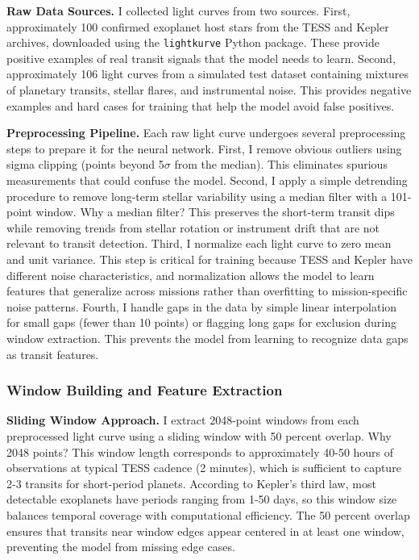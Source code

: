\documentclass[letterpaper]{article} %
\begin{document}
\textbf{Raw Data Sources.} I collected light curves from two sources. First, approximately 100 confirmed exoplanet host stars from the TESS and Kepler archives, downloaded using the \texttt{lightkurve} Python package. These provide positive examples of real transit signals that the model needs to learn. Second, approximately 106 light curves from a simulated test dataset containing mixtures of planetary transits, stellar flares, and instrumental noise. This provides negative examples and hard cases for training that help the model avoid false positives.

\textbf{Preprocessing Pipeline.} Each raw light curve undergoes several preprocessing steps to prepare it for the neural network. First, I remove obvious outliers using sigma clipping (points beyond 5$\sigma$ from the median). This eliminates spurious measurements that could confuse the model. Second, I apply a simple detrending procedure to remove long-term stellar variability using a median filter with a 101-point window. Why a median filter? This preserves the short-term transit dips while removing trends from stellar rotation or instrument drift that are not relevant to transit detection. Third, I normalize each light curve to zero mean and unit variance. This step is critical for training because TESS and Kepler have different noise characteristics, and normalization allows the model to learn features that generalize across missions rather than overfitting to mission-specific noise patterns. Fourth, I handle gaps in the data by simple linear interpolation for small gaps (fewer than 10 points) or flagging long gaps for exclusion during window extraction. This prevents the model from learning to recognize data gaps as transit features.

\subsubsection{Window Building and Feature Extraction}

\textbf{Sliding Window Approach.} I extract 2048-point windows from each preprocessed light curve using a sliding window with 50 percent overlap. Why 2048 points? This window length corresponds to approximately 40-50 hours of observations at typical TESS cadence (2 minutes), which is sufficient to capture 2-3 transits for short-period planets. According to Kepler's third law, most detectable exoplanets have periods ranging from 1-50 days, so this window size balances temporal coverage with computational efficiency. The 50 percent overlap ensures that transits near window edges appear centered in at least one window, preventing the model from missing edge cases.
\end{document}

